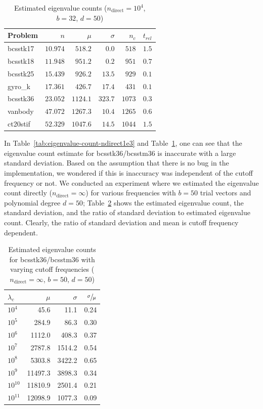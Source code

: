 \documentclass[%
	paper=a4,
	fontsize=10pt,
	DIV11,BCOR10mm,
	numbers=noenddot,
	abstract=yes
]{scrartcl}
\theoremstyle{definition}
\begin{document}
\begin{table}
	\centering
	\begin{tabular}{lrrrrr}
		Problem & $n$ & $\mu$ & $\sigma$ & $n_c$ & $t_{rel}$ \\
		\toprule
		bcsstk17 & $10.974$ &  $518.2$ &   $0.0$ &  $518$ & $1.5$ \\
		bcsstk18 & $11.948$ &  $951.2$ &   $0.2$ &  $951$ & $0.7$ \\
		bcsstk25 & $15.439$ &  $926.2$ &  $13.5$ &  $929$ & $0.1$ \\
		gyro\_k  & $17.361$ &  $426.7$ &  $17.4$ &  $431$ & $0.1$ \\
		bcsstk36 & $23.052$ & $1124.1$ & $323.7$ & $1073$ & $0.3$ \\
		vanbody  & $47.072$ & $1267.3$ &  $10.4$ & $1265$ & $0.6$ \\
		ct20stif & $52.329$ & $1047.6$ &  $14.5$ & $1044$ & $1.5$
	\end{tabular}
	\caption{Estimated eigenvalue counts ($n_{\text{direct}} = 10^4$, $b = 32$,
	$d = 50$)}
	\label{tab:eigenvalue-count-ndirect1e4}
\end{table}

In Table~\ref{tab:eigenvalue-count-ndirect1e3} and
Table~\ref{tab:eigenvalue-count-ndirect1e4}, one can see that the eigenvalue
count estimate for bcsstk36/bcsstm36 is inaccurate with a large standard
deviation. Based on the assumption that there is no bug in the implementation,
we wondered if this is inaccuracy was independent of the cutoff frequency or
not. We conducted an experiment where we estimated the eigenvalue count directly
($n_{\text{direct}} = \infty$) for various frequencies with $b = 50$ trial
vectors and polynomial degree $d = 50$;
Table~\ref{tab:eigenvalue-count-bcsstk36} shows the estimated eigenvalue count,
the standard deviation, and the ratio of standard deviation to estimated
eigenvalue count. Clearly, the ratio of standard deviation and mean is
cutoff frequency dependent.

\begin{table}
	\centering
	\begin{tabular}{lrrr}
		$\lambda_c$ & $\mu$ & $\sigma$ & $\sfrac{\sigma}{\mu}$ \\
		\toprule
		$10^{ 4}$ &    45.6 &   11.1 & 0.24 \\
		$10^{ 5}$ &   284.9 &   86.3 & 0.30 \\
		$10^{ 6}$ &  1112.0 &  408.3 & 0.37 \\
		$10^{ 7}$ &  2787.8 & 1514.2 & 0.54 \\
		$10^{ 8}$ &  5303.8 & 3422.2 & 0.65 \\
		$10^{ 9}$ & 11497.3 & 3898.3 & 0.34 \\
		$10^{10}$ & 11810.9 & 2501.4 & 0.21 \\
		$10^{11}$ & 12098.9 & 1077.3 & 0.09
	\end{tabular}
	\caption{Estimated eigenvalue counts for bcsstk36/bcsstm36 with varying
	cutoff frequencies ($n_{\text{direct}} = \infty$, $b = 50$, $d = 50$)}
	\label{tab:eigenvalue-count-bcsstk36}
\end{table}
\end{document}
